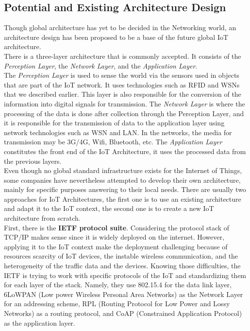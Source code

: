 \subsection{Potential and Existing Architecture Design}

Though global architecture has yet to be decided in the Networking world, an architecture design has been proposed to be a base of the future global IoT architecture. \\

There is a three-layer architecture that is commonly accepted. It consists of the \textit{Perception Layer}, the \textit{Network Layer}, and the \textit{Application Layer}. \\

The \textit{Perception Layer} is used to sense the world via the sensors used in objects that are part of the IoT network. It uses technologies such as RFID and WSNs that we described earlier. This layer is also responsible for the conversion of the information into digital signals for transmission. The \textit{Network Layer} is where the processing of the data is done after collection through the Perception Layer, and it is responsible for the transmission of data to the application layer using network technologies such as WSN and LAN. In the networks, the media for transmission may be 3G/4G, Wifi, Bluetooth, etc. The \textit{Application Layer} constitutes the front end of the IoT Architecture, it uses the processed data from the previous layers.\\

Even though no global standard infrastructure exists for the Internet of Things, some companies have nevertheless attempted to develop their own architecture, mainly for specific purposes answering to their local needs. There are usually two approaches for IoT Architectures, the first one is to use an existing architecture and adapt it to the IoT context, the second one is to create a new IoT architecture from scratch.\\

First, there is the \textbf{IETF protocol suite}. Considering the protocol stack of TCP/IP makes sense since it is widely deployed on the internet. However, applying it to the IoT context make the deployment challenging because of resources scarcity of IoT devices, the instable wireless communication, and the heterogeneity of the traffic data and the devices. Knowing those difficulties, the IETF is trying to work with specific protocols of the IoT and standardizing them  for each layer of the stack. Namely, they use 802.15.4 \cite{molisch2004ieee} for the data link layer, 6LoWPAN \cite{montenegro2007transmission} (Low power Wireless Personal Area Networks) as the Network Layer for an addressing scheme, RPL \cite{winter2012rpl} (Routing Protocol for Low Power and Lossy Networks) as a routing protocol, and CoAP \cite{shelby2014constrained} (Constrained Application Protocol) as the application layer.\\

